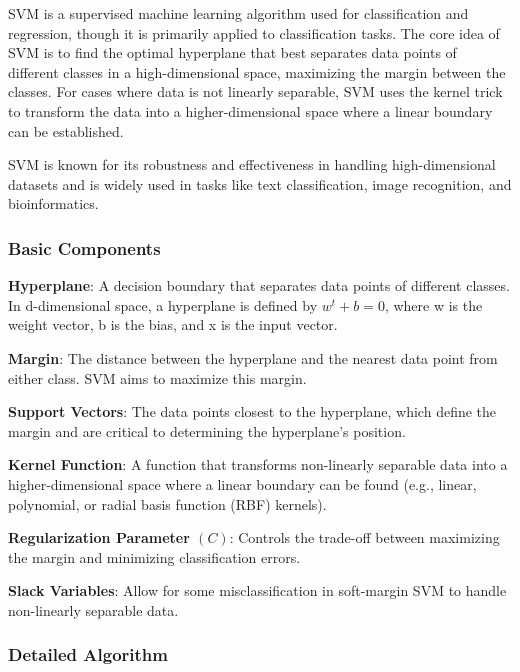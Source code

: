 SVM is a supervised machine learning algorithm used for classification and regression, though it is primarily applied to classification tasks.
The core idea of SVM is to find the optimal hyperplane that best separates data points of different classes in a high-dimensional space, maximizing the margin between the classes.
For cases where data is not linearly separable, SVM uses the kernel trick to transform the data into a higher-dimensional space where a linear boundary can be established.

SVM is known for its robustness and effectiveness in handling high-dimensional datasets and is widely used in tasks like text classification, image recognition, and bioinformatics.

\subsubsection{Basic Components}\textbf{}

\smallskip
\textbf{Hyperplane}: A decision boundary that separates data points of different classes.
In d-dimensional space, a hyperplane is defined by $w^t +b = 0$, where w is the weight vector, b is the bias, and x is the input vector.

\textbf{Margin}: The distance between the hyperplane and the nearest data point from either class.
SVM aims to maximize this margin.

\textbf{Support Vectors}: The data points closest to the hyperplane, which define the margin and are critical to determining the hyperplane’s position.

\textbf{Kernel Function}: A function that transforms non-linearly separable data into a higher-dimensional space where a linear boundary can be found (e.g., linear, polynomial, or radial basis function (RBF) kernels).

\textbf{Regularization Parameter $(C)$}: Controls the trade-off between maximizing the margin and minimizing classification errors.

\textbf{Slack Variables}: Allow for some misclassification in soft-margin SVM to handle non-linearly separable data.

\smallskip

\subsubsection{Detailed Algorithm}\textbf{}


